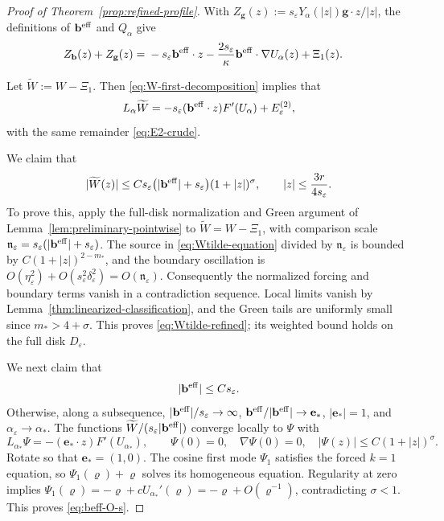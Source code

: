 \documentclass[11pt,reqno]{amsart}
\numberwithin{equation}{section}
\theoremstyle{definition}
\theoremstyle{remark}
\newcommand{\eps}{\varepsilon}
\newcommand{\etae}{\eta_{\eps}}
\newcommand{\de}{\delta_{\eps}}
\begin{document}
\begin{proof}[Proof of Theorem~\ref{prop:refined-profile}]
With $Z_{\mathbf g}(z):=s_\eps Y_\alpha(|z|)\mathbf g\cdot z/|z|$,
the definitions of $\mathbf b^{\rm eff}$ and $Q_\alpha$ give
\begin{align}
  Z_{\mathbf{b}}(z)+Z_{\mathbf{g}}(z)
  ={}&
  -s_\eps \mathbf{b}^{\rm eff}\cdot z
  -\frac{2s_\eps}{\kappa}
   \mathbf{b}^{\rm eff}\cdot\nabla U_\alpha(z)
  +\Xi_1(z).
  \label{eq:first-mode-effective-decomposition}
\end{align}

Let \(\widetilde W:=W-\Xi_1\).
Then \eqref{eq:W-first-decomposition} implies that
{ 
\begin{equation}
  L_\alpha\widetilde W
  =
  -s_\eps(\mathbf{b}^{\rm eff}\cdot z)F'(U_\alpha)
  + E_\eps^{(2)},
  \label{eq:Wtilde-equation}
\end{equation}
}
with the same remainder \eqref{eq:E2-crude}.

\medskip
{}
We claim that
\begin{equation}
  |\widetilde W(z)|
  \le
  Cs_\eps\bigl(|\mathbf{b}^{\rm eff}|+s_\eps\bigr)(1+|z|)^\sigma, 
  \qquad
  |z|\le\frac{3r}{4s_\eps}.
  \label{eq:Wtilde-refined}
\end{equation}
To prove this, apply the full-disk normalization and Green argument
of Lemma~\ref{lem:preliminary-pointwise} to
$\widetilde W=W-\Xi_1$, with comparison scale
$\mathfrak n_\eps=s_\eps(|\mathbf{b}^{\rm eff}|+s_\eps)$. The source in
\eqref{eq:Wtilde-equation} divided by $\mathfrak n_\eps$ is bounded by
$C(1+|z|)^{2-m_*}$, and the boundary oscillation is
$O(\etae^2)+O(s_\eps^2\de^2)=O(\mathfrak n_\eps)$.
Consequently the normalized forcing and boundary terms vanish in a
contradiction sequence. Local limits vanish by
Lemma~\ref{thm:linearized-classification}, and the Green tails are
uniformly small since $m_*>4+\sigma$. This proves
\eqref{eq:Wtilde-refined}; its weighted bound holds on the full disk
$D_\eps$.

We next claim that
\begin{equation}
  |\mathbf{b}^{\rm eff}|\le Cs_\eps.
  \label{eq:beff-O-s}
\end{equation}
Otherwise, along a subsequence,
$|\mathbf{b}^{\rm eff}|/s_\eps\to\infty$,
$\mathbf{b}^{\rm eff}/|\mathbf{b}^{\rm eff}|\to\mathbf e_*$, $|\mathbf e_*|=1$, and
$\alpha_\eps\to\alpha_*$. The functions
$\widetilde W/(s_\eps|\mathbf{b}^{\rm eff}|)$ converge locally to $\Psi$ with
\begin{equation}\label{eq:Psi-effective-limit}
 L_{\alpha_*}\Psi=-(\mathbf e_*\cdot z)F'(U_{\alpha_*}),\qquad
 \Psi(0)=0,\quad\nabla\Psi(0)=0,\quad
 |\Psi(z)|\le C(1+|z|)^\sigma.
\end{equation}
Rotate so that $\mathbf e_*=(1,0)$. The cosine first mode $\Psi_1$ satisfies
the forced $k=1$ equation, so $\Psi_1(\varrho)+\varrho$ solves its homogeneous
equation. Regularity at zero implies
$\Psi_1(\varrho)=-\varrho+cU_{\alpha_*}'(\varrho)=-\varrho+O(\varrho^{-1})$, contradicting
$\sigma<1$. This proves \eqref{eq:beff-O-s}.


\end{proof}
\end{document}
